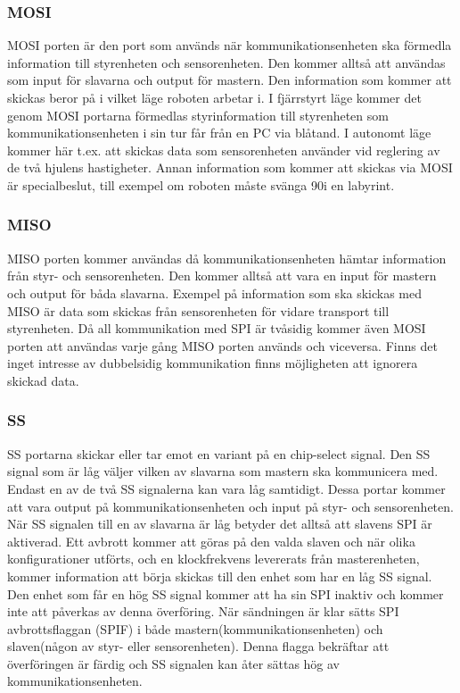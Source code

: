 \subsubsection{MOSI}
MOSI porten är den port som används när kommunikationsenheten ska förmedla
information till styrenheten och sensorenheten. Den kommer alltså att användas som
input för slavarna och output för mastern. Den information som kommer att
skickas beror på i vilket läge roboten arbetar i. I fjärrstyrt läge kommer det
genom MOSI portarna förmedlas styrinformation till styrenheten som
kommunikationsenheten i sin tur får från en PC via blåtand. I autonomt läge
kommer här t.ex. att skickas data som sensorenheten använder vid
reglering av de två hjulens hastigheter. Annan information som kommer att skickas via MOSI är
specialbeslut, till exempel om roboten måste svänga 90\degree i en labyrint.

\subsubsection{MISO}
MISO porten kommer användas då kommunikationsenheten hämtar information från styr- och sensorenheten. Den kommer alltså att vara en input för mastern och output för båda slavarna. Exempel på information som ska skickas med MISO är data som skickas från sensorenheten för vidare transport till styrenheten.
Då all kommunikation med SPI är tvåsidig kommer även MOSI porten att användas varje gång MISO porten används och viceversa. Finns det inget intresse av dubbelsidig kommunikation finns möjligheten att ignorera skickad data.

\subsubsection{SS}
SS portarna skickar eller tar emot en variant på en chip-select signal. Den SS signal som är låg väljer vilken av slavarna som mastern ska kommunicera med. Endast en av de två SS signalerna kan vara låg samtidigt. Dessa portar kommer att vara output på kommunikationsenheten och input på styr- och sensorenheten.
När SS signalen till en av slavarna är låg betyder det alltså att slavens SPI är aktiverad. Ett avbrott kommer att göras på den valda slaven och när olika konfigurationer utförts, och en klockfrekvens levererats från masterenheten, kommer information att börja skickas till den enhet som har en låg SS signal. Den enhet som får en hög SS signal kommer att ha sin SPI inaktiv och kommer inte att påverkas av denna överföring.
När sändningen är klar sätts SPI avbrottsflaggan (SPIF) i både mastern(kommunikationsenheten) och slaven(någon av styr- eller sensorenheten). Denna flagga bekräftar att överföringen är färdig och SS signalen kan åter sättas hög av kommunikationsenheten.

